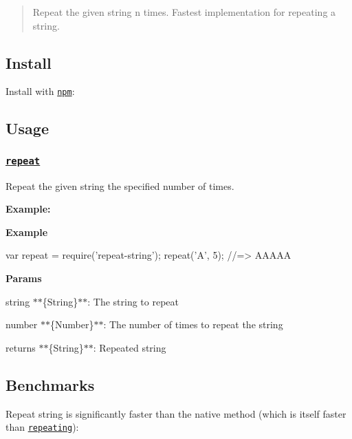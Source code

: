 \begin{quote}
Repeat the given string n times. Fastest implementation for repeating a string. \end{quote}


\subsection*{Install}

Install with \href{https://www.npmjs.com/}{\tt npm}\+:




\subsection*{Usage}

\subsubsection*{\href{index.js#L41}{\tt repeat}}

Repeat the given {\ttfamily string} the specified {\ttfamily number} of times.

{\bfseries Example\+:}

{\bfseries Example}


\begin{DoxyCode}
var repeat = require('repeat-string');
repeat('A', 5);
//=> AAAAA
\end{DoxyCode}


{\bfseries Params}


\begin{DoxyItemize}
\item {\ttfamily string} $\ast$$\ast$\{String\}$\ast$$\ast$\+: The string to repeat
\item {\ttfamily number} $\ast$$\ast$\{Number\}$\ast$$\ast$\+: The number of times to repeat the string
\item {\ttfamily returns} $\ast$$\ast$\{String\}$\ast$$\ast$\+: Repeated string
\end{DoxyItemize}

\subsection*{Benchmarks}

Repeat string is significantly faster than the native method (which is itself faster than \href{https://github.com/sindresorhus/repeating}{\tt repeating})\+:


